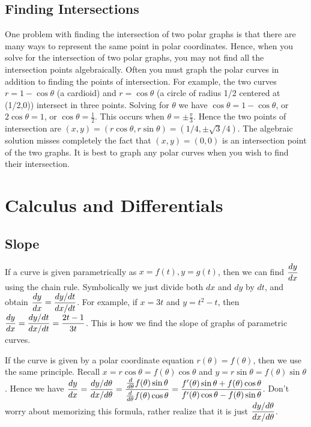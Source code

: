 {{{{{{{\subsection{Finding Intersections}
One problem with finding the intersection of two polar graphs is that there are many ways to represent the same point in polar coordinates.  Hence, when you solve for the intersection of two polar graphs, you may not find all the intersection points algebraically. Often you must graph the polar curves in addition to finding the points of intersection.  For example, the two curves $r=1-\cos\theta$ (a cardioid) and $r=\cos\theta$ (a circle of radius 1/2 centered at (1/2,0)) intersect in three points.  Solving for $\theta$ we have $\cos\theta = 1-\cos\theta$, or $2\cos\theta = 1$, or $\cos\theta = \frac{1}{2}$.  This occurs when $\theta = \pm \frac{\pi}{3}$. Hence the two points of intersection are $(x,y)=(r\cos\theta,r\sin\theta) = (1/4,\pm\sqrt 3 / 4)$.  The algebraic solution misses completely the fact that $(x,y)=(0,0)$ is an intersection point of the two graphs. It is best to graph any polar curves when you wish to find their intersection.



\section{Calculus and Differentials}

\subsection{Slope}
If a curve is given parametrically as $x=f(t),y=g(t)$, then we can find $\displaystyle\frac{dy}{dx}$ using the chain rule. Symbolically we just divide both $dx$ and $dy$ by $dt$, and obtain $\displaystyle\frac{dy}{dx} = \displaystyle\frac{dy/dt}{dx/dt}$.  For example, if $x=3t$ and $y=t^2-t$, then $\displaystyle\frac{dy}{dx} = \displaystyle\frac{dy/dt}{dx/dt}=\frac{2t-1}{3t}$.  This is how we find the slope of graphs of parametric curves.

If the curve is given by a polar coordinate equation $r(\theta)=f(\theta)$, then we use the same principle.  Recall $x=r\cos\theta = f(\theta)\cos\theta$ and $y=r\sin\theta = f(\theta)\sin\theta$.  Hence we have 
$\displaystyle\frac{dy}{dx} 
= \displaystyle\frac{dy/d\theta}{dx/d\theta} 
= \frac{\frac{d}{d\theta} f(\theta)\sin\theta }{\frac{d}{d\theta} f(\theta)\cos\theta } 
= \frac{f^\prime (\theta)\sin\theta +f(\theta)\cos\theta }{ f^\prime(\theta)\cos\theta - f(\theta)\sin\theta} 
$. Don't worry about memorizing this formula, rather realize that it is just $\displaystyle\frac{dy/d\theta}{dx/d\theta}$.





}}}}}}}
